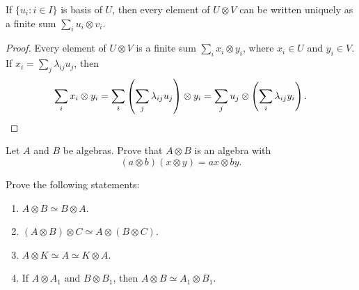 \begin{corollary}
	If $\{u_i:i\in I\}$ is basis of $U$, then every element of $U\otimes V$
	can be written uniquely as a finite sum $\sum_{i}u_i\otimes v_i$.
\end{corollary}

\begin{proof}
	Every element of $U\otimes V$ is a finite sum 
	$\sum_i x_i\otimes y_i$, where $x_i\in U$ and $y_i\in V$. If  
	$x_i=\sum_j\lambda_{ij}u_j$, then 
	\[
		\sum_i x_i\otimes y_i=\sum_i\left(\sum_j\lambda_{ij}u_j\right)\otimes y_i		
		=\sum_j u_j\otimes\left(\sum_i\lambda_{ij}y_i\right).\qedhere 
	\]
\end{proof}

%

\begin{exercise}
\label{xca:tensor_algebras}
    Let $A$ and $B$ be algebras. Prove that $A\otimes B$ 
    is an algebra with 
	\[
		(a\otimes b)(x\otimes y)=ax\otimes by.
	\]
\end{exercise}


\begin{exercise}
    Prove the following statements:
	\begin{enumerate}
		\item $A\otimes B\simeq B\otimes A$.
		\item $(A\otimes B)\otimes C\simeq A\otimes(B\otimes C)$.
		\item $A\otimes K\simeq A\simeq K\otimes A$.
		\item If $A\otimes A_1$ and $B\otimes B_1$, then $A\otimes B\simeq A_1\otimes B_1$.
	\end{enumerate}
\end{exercise}

